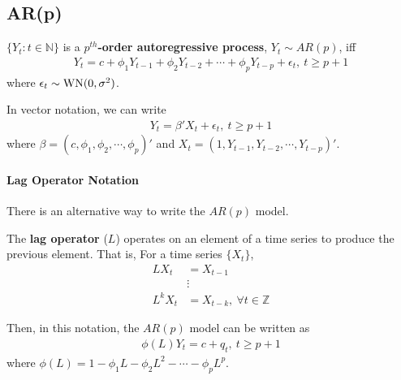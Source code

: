 \documentclass[11pt]{elegantbook}
\begin{document}
\subsection{AR(p)}
\begin{definition}[AR(p)]
    $\{Y_t:t\in \mathbb{N}\}$ is a \textbf{$p^{th}$-order autoregressive process}, $Y_t\sim AR(p)$, iff
    \begin{equation}
        \begin{aligned}
            Y_t=c+\phi_1 Y_{t-1}+\phi_2 Y_{t-2}+\cdots+\phi_p Y_{t-p}+\epsilon_t,\ t\geq p+1
        \end{aligned}
        \nonumber
    \end{equation}
    where $\epsilon_t\sim \textnormal{WN}(0,\sigma^2)$.
\end{definition}
In vector notation, we can write
\begin{equation}
    \begin{aligned}
        Y_t=\beta'X_t+\epsilon_t,\ t\geq p+1
    \end{aligned}
    \nonumber
\end{equation}
where $\beta=(c,\phi_1,\phi_2,\cdots,\phi_p)'$ and $X_t=(1,Y_{t-1},Y_{t-2},\cdots,Y_{t-p})'$.

\paragraph*{Lag Operator Notation} There is an alternative way to write the $AR(p)$ model.
\begin{definition}
    The \textbf{lag operator} ($L$) operates on an element of a time series to produce the previous element. That is, For a time series $\{X_t\}$,
    \begin{equation}
        \begin{aligned}
            L X_t&=X_{t-1}\\
            &\vdots\\
            L^k X_t&=X_{t-k},\ \forall t\in \mathbb{Z}
        \end{aligned}
        \nonumber
    \end{equation}
\end{definition}

Then, in this notation, the $AR(p)$ model can be written as
\begin{equation}
    \begin{aligned}
        \phi(L)Y_t=c+q_t,\ t\geq p+1
    \end{aligned}
    \nonumber
\end{equation}
where $\phi(L)=1-\phi_1 L - \phi_2 L^2 - \cdots - \phi_p L^p$.
\end{document}
